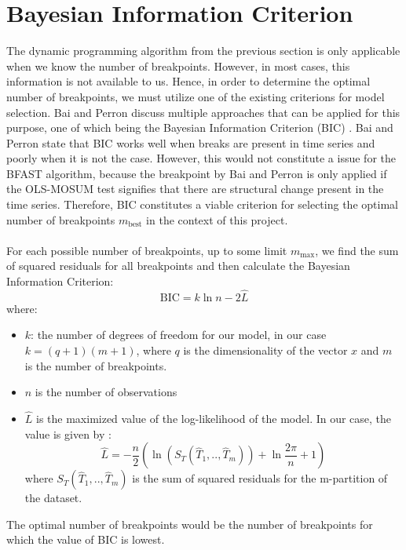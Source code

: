 \documentclass[main.tex]{subfiles}
\begin{document}
\section{Bayesian Information Criterion}
\label{sec:bayesian_information_criterion}
The dynamic programming algorithm from the previous section is only applicable when we know
the number of breakpoints. However, in most cases, this information is not available to us.
Hence, in order to determine the optimal number of breakpoints, we must utilize
one of the existing criterions for model selection. Bai and Perron \cite{bai_perron} discuss
multiple approaches that can be applied for this purpose, one of which being
the Bayesian Information Criterion (BIC) \cite{schwarz1978}.
Bai and Perron state that BIC works well when breaks are present
in time series and poorly when it is not the case. However, this would not
constitute a issue for
the BFAST algorithm, because the breakpoint by Bai and Perron is only applied if
the OLS-MOSUM test signifies that there are structural change present in the
time series. Therefore, BIC constitutes a viable criterion for selecting the
optimal number of breakpoints $m_{\text{best}}$ in the context of this project.\\\\
For each possible number of breakpoints, up to some
limit $m_{\text{max}}$, we find the sum of squared residuals for all breakpoints
and
then calculate the Bayesian Information Criterion:
\[
\text{BIC} = k \ln{n} - 2 {\hat{L}}
\]
where:
\begin{itemize}
\item $k$: the number of degrees of freedom for our model, in our case
  $k = (q + 1) (m + 1)$, where $q$ is the dimensionality of the vector $x$ and
  $m$ is the number of breakpoints.
\item $n$ is the number of observations
\item $\hat{L}$ is the maximized value of the log-likelihood of the model. In our case,
  the value is given by \cite{yao1988}:
  \[
  \hat{L} = -\frac{n}{2} \left(\ln \left(S_T(\hat{T}_1,..,\hat{T}_m)\right)
  + \ln{\frac{2\pi}{n}} + 1\right)
  \]
  where $S_T(\hat{T}_1,..,\hat{T}_m)$ is the sum of squared residuals for the m-partition of
  the dataset.
\end{itemize}
The optimal number of breakpoints would be the number of breakpoints for which
the value of BIC is lowest.
\end{document}
